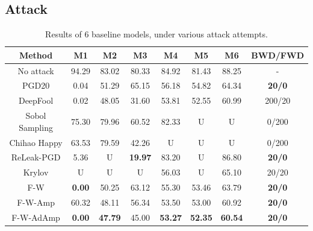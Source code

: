 \documentclass{article}
\begin{document}
    \subsection{Attack}\label{sub:AttackExp}
    \begin{table}[h]
        \centering
        \begin{tabular}{cccccccc}
            \hline
            Method         & M1            & M2             & M3             & M4             & M5             & M6             & BWD/FWD       \\ \hline
            No attack      & 94.29         & 83.02          & 80.33          & 84.92          & 81.43          & 88.25          & -             \\
            PGD20          & 0.04          & 51.29          & 65.15          & 56.18          & 54.82          & 64.34          & \textbf{20/0} \\
            DeepFool       & 0.02          & 48.05          & 31.60          & 53.81          & 52.55          & 60.99          & 200/20        \\
            Sobol Sampling & 75.30         & 79.96          & 60.52          & 82.33          & U              & U              & 0/200         \\
            Chihao Happy   & 63.53         & 79.59          & 42.26          & U              & U              & U              & 0/200         \\
            ReLeak-PGD     & 5.36          & U              & \textbf{19.97} & 83.20          & U              & 86.80          & \textbf{20/0} \\
            Krylov         & U             & U              & U              & 56.03          & U              & 65.10          & 20/20         \\
            F-W            & \textbf{0.00} & 50.25          & 63.12          & 55.30          & 53.46          & 63.79          & \textbf{20/0} \\
            F-W-Amp        & 60.32         & 48.11          & 56.34          & 53.50          & 53.00          & 60.92          & \textbf{20/0} \\
            F-W-AdAmp      & \textbf{0.00} & \textbf{47.79} & 45.00          & \textbf{53.27} & \textbf{52.35} & \textbf{60.54} & \textbf{20/0} \\ \hline
            \end{tabular}
        \caption{Results of 6 baseline models, under various attack attempts.}
    \end{table}
\end{document}
